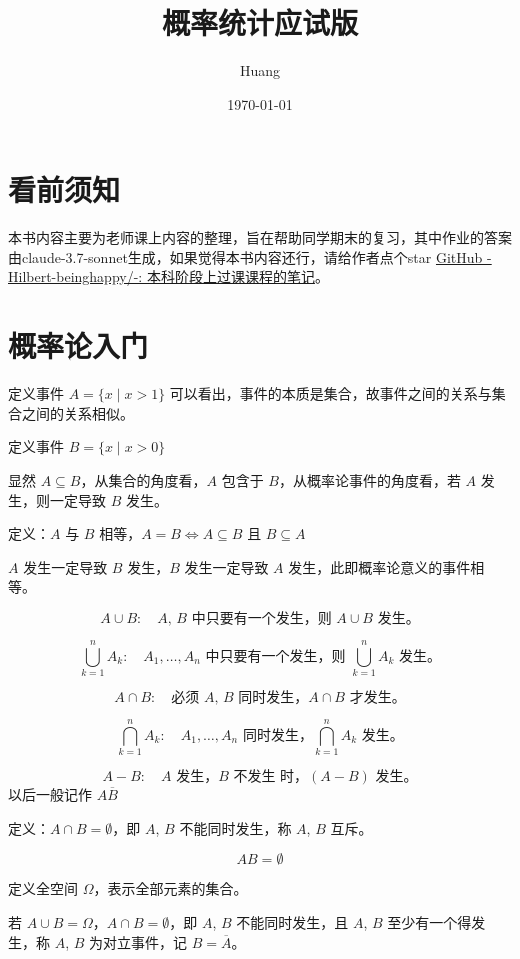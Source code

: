 \documentclass[lang=cn,10pt,thmcnt=section]{elegantbook}
\title{概率统计应试版}
\author{Huang}
\date{\today}
\begin{document}
	
	\maketitle
	\frontmatter
	
	\tableofcontents
	
	\mainmatter
	\chapter{看前须知}
	本书内容主要为老师课上内容的整理，旨在帮助同学期末的复习，其中作业的答案由claude-3.7-sonnet生成，如果觉得本书内容还行，请给作者点个star
	\href{https://github.com/Hilbert-beinghappy/-}{GitHub - Hilbert-beinghappy/-: 本科阶段上过课课程的笔记}。

	\chapter{概率论入门}
	定义事件 $A = \{x \mid x > 1\}$ 可以看出，事件的本质是集合，故事件之间的关系与集合之间的关系相似。

定义事件 $B = \{x \mid x > 0\}$


显然 $A \subseteq B$，从集合的角度看，$A$ 包含于 $B$，从概率论事件的角度看，若 $A$ 发生，则一定导致 $B$ 发生。


定义：$A$ 与 $B$ 相等，$A = B \Leftrightarrow A \subseteq B \text{ 且 } B \subseteq A$

$A$ 发生一定导致 $B$ 发生，$B$ 发生一定导致 $A$ 发生，此即概率论意义的事件相等。

\[
A \cup B : \quad \text{$A$, $B$ 中只要有一个发生，则 } A \cup B \text{ 发生。}
\]

\[
\bigcup_{k=1}^{n} A_k : \quad \text{$A_1, \ldots, A_n$ 中只要有一个发生，则 } \bigcup_{k=1}^{n} A_k \text{ 发生。}
\]

\[
A \cap B : \quad \text{必须 $A$, $B$ 同时发生，$A \cap B$ 才发生。}
\]

\[
\bigcap_{k=1}^{n} A_k : \quad \text{$A_1, \ldots, A_n$ 同时发生，$\bigcap_{k=1}^{n} A_k$ 发生。}
\]

\[
A - B : \quad \text{$A$ 发生，$B$ 不发生 时，$(A - B)$ 发生。}
\]
以后一般记作 $A \overline{B}$

定义：$A \cap B = \emptyset$，即 $A$, $B$ 不能同时发生，称 $A$, $B$ 互斥。

\[
AB = \emptyset
\]

定义全空间 $\Omega$，表示全部元素的集合。


若 $A \cup B = \Omega$，$A \cap B = \emptyset$，即 $A$, $B$ 不能同时发生，且 $A$, $B$ 至少有一个得发生，称 $A$, $B$ 为对立事件，记 $B = \overline{A}$。
\end{document}
